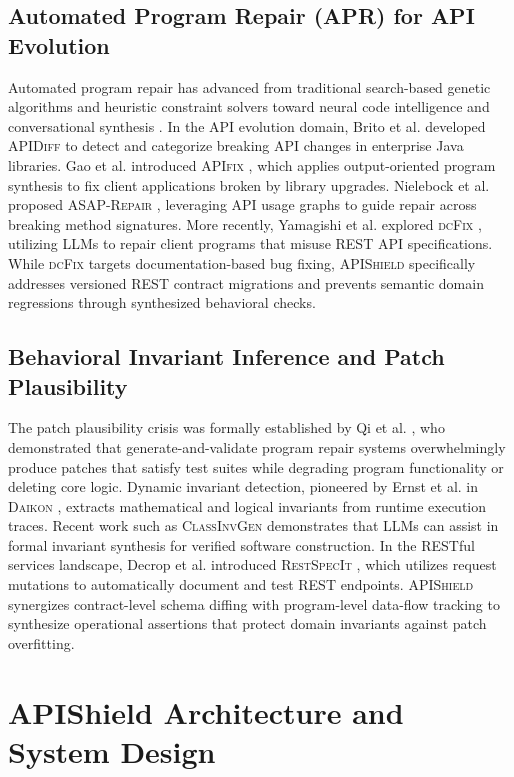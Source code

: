 \subsection{Automated Program Repair (APR) for API Evolution}
Automated program repair has advanced from traditional search-based genetic algorithms and heuristic constraint solvers toward neural code intelligence and conversational synthesis \cite{chatrepair2024, swebench2024, repairagent2024}. In the API evolution domain, Brito et al. developed \textsc{APIDiff} \cite{apidiff2018} to detect and categorize breaking API changes in enterprise Java libraries. Gao et al. introduced \textsc{APIfix} \cite{apifix2021}, which applies output-oriented program synthesis to fix client applications broken by library upgrades. Nielebock et al. proposed \textsc{ASAP-Repair} \cite{asap2024}, leveraging API usage graphs to guide repair across breaking method signatures. More recently, Yamagishi et al. explored \textsc{dcFix} \cite{dcfix2025}, utilizing LLMs to repair client programs that misuse REST API specifications. While \textsc{dcFix} targets documentation-based bug fixing, \textsc{APIShield} specifically addresses versioned REST contract migrations and prevents semantic domain regressions through synthesized behavioral checks.

\subsection{Behavioral Invariant Inference and Patch Plausibility}
The patch plausibility crisis was formally established by Qi et al. \cite{plausibility2015}, who demonstrated that generate-and-validate program repair systems overwhelmingly produce patches that satisfy test suites while degrading program functionality or deleting core logic. Dynamic invariant detection, pioneered by Ernst et al. in \textsc{Daikon} \cite{daikon2007}, extracts mathematical and logical invariants from runtime execution traces. Recent work such as \textsc{ClassInvGen} \cite{classinvgen2025} demonstrates that LLMs can assist in formal invariant synthesis for verified software construction. In the RESTful services landscape, Decrop et al. introduced \textsc{RestSpecIt} \cite{restspecit2025}, which utilizes request mutations to automatically document and test REST endpoints. \textsc{APIShield} synergizes contract-level schema diffing with program-level data-flow tracking to synthesize operational assertions that protect domain invariants against patch overfitting.

\section{APIShield Architecture and System Design}
\label{sec:architecture}

